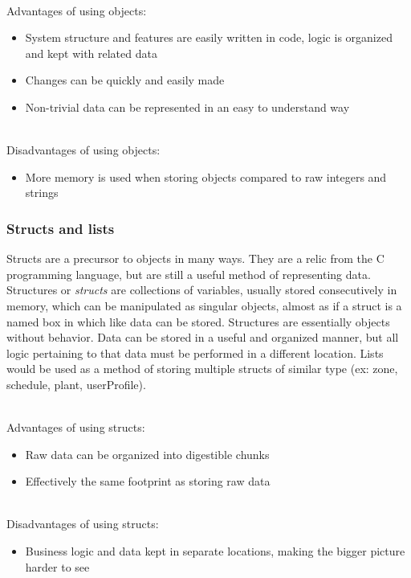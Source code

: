 \documentclass[onecolumn, draftclsnofoot,10pt, compsoc]{IEEEtran}
\begin{document}
			\noindent \\Advantages of using objects:
			\begin{itemize}
				\item System structure and features are easily written in code, logic is organized and kept with related data
				\item Changes can be quickly and easily made
				\item Non-trivial data can be represented in an easy to understand way
			\end{itemize}

			\noindent \\Disadvantages of using objects:
			\begin{itemize}
				\item More memory is used when storing objects compared to raw integers and strings
			\end{itemize}


			\subsubsection{Structs and lists}
			Structs are a precursor to objects in many ways. They are a relic from the C programming language, but are still a useful method of representing data.
			Structures or \textit{structs} are collections of variables, usually stored consecutively in memory, which can be manipulated as singular objects, almost as if a struct is a named box in which like data can be stored.
			Structures are essentially objects without behavior. Data can be stored in a useful and organized manner, but all logic pertaining to that data must be performed in a different location.
			Lists would be used as a method of storing multiple structs of similar type (ex: zone, schedule, plant, userProfile).

			\noindent \\Advantages of using structs:
			\begin{itemize}
				\item Raw data can be organized into digestible chunks
				\item Effectively the same footprint as storing raw data
			\end{itemize}

			\noindent \\Disadvantages of using structs:
			\begin{itemize}
				\item Business logic and data kept in separate locations, making the bigger picture harder to see
			\end{itemize}
\end{document}
